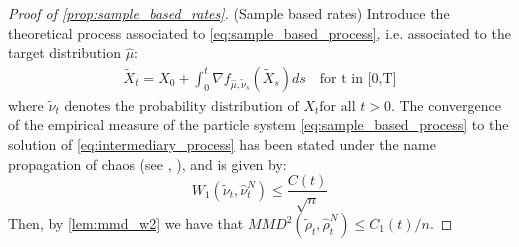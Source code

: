 \begin{proof}[Proof of \cref{prop:sample_based_rates}](Sample based rates)
	Introduce the theoretical process associated to \eqref{eq:sample_based_process}, i.e. associated to the target distribution $\widehat{\mu}$:
	\begin{align}\label{eq:intermediary_process}
	\widetilde{X}_t=X_{0}+\int_{0}^t \nabla f_{\widehat{\mu}, \widetilde{\nu}_s}(\widetilde{X}_s)ds \quad \text{for t in [0,T]}
	\end{align}
	where $\widetilde{\nu}_t \text{ denotes the probability distribution of } X_t \text{for all } t>0$. The convergence of the empirical measure of the particle system \eqref{eq:sample_based_process} to the solution of \eqref{eq:intermediary_process} has been stated under the name propagation of chaos (see \cite{kac1956foundations}, \cite{sznitman1991topics}), and is given by:
	\begin{equation}
	W_1(\widetilde{\nu}_t,\widehat{\nu}_t^N)\le \frac{C(t)}{\sqrt{n}}
	\end{equation}
	Then, by \cref{lem:mmd_w2} we have that $MMD^2(\widetilde{\rho}_t,\widehat{\rho}_t^N)\le C_1(t)/n$.%
	

\end{proof}
